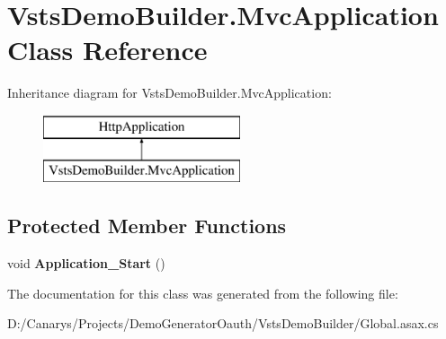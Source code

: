 \hypertarget{class_vsts_demo_builder_1_1_mvc_application}{}\section{Vsts\+Demo\+Builder.\+Mvc\+Application Class Reference}
\label{class_vsts_demo_builder_1_1_mvc_application}
Inheritance diagram for Vsts\+Demo\+Builder.\+Mvc\+Application\+:\begin{figure}[H]
\begin{center}
\leavevmode
\includegraphics[height=2.000000cm]{class_vsts_demo_builder_1_1_mvc_application}
\end{center}
\end{figure}
\subsection*{Protected Member Functions}
\begin{DoxyCompactItemize}
\item 
\mbox{\label{class_vsts_demo_builder_1_1_mvc_application_a90a8975d11f57fb4aa8786689d98ff8f}} 
void {\bfseries Application\+\_\+\+Start} ()
\end{DoxyCompactItemize}


The documentation for this class was generated from the following file\+:\begin{DoxyCompactItemize}
\item 
D\+:/\+Canarys/\+Projects/\+Demo\+Generator\+Oauth/\+Vsts\+Demo\+Builder/Global.\+asax.\+cs\end{DoxyCompactItemize}
